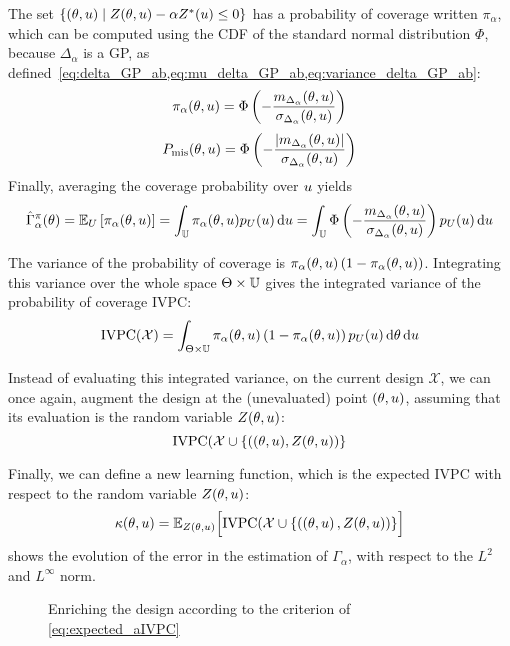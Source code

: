 \documentclass[../../Main_ManuscritThese.tex]{subfiles}
\newcommand\imgpath{/home/victor/acadwriting/Manuscrit/Text/Chapter4/img/}
\begin{document}
  
The set $\{(\theta, u) \mid Z(\theta, u) - \alpha Z^*(u)\leq 0\}$ has a probability of coverage written $\pi_{\alpha}$, which can be computed using the CDF of the standard normal distribution $\Phi$, because $\Delta_{\alpha}$ is a GP, as defined~\cref{eq:delta_GP_ab,eq:mu_delta_GP_ab,eq:variance_delta_GP_ab}:
\begin{equation}
  \label{eq:def_pialphaku}
  \pi_{\alpha}(\theta,u) = \Phi\left(-\frac{m_{\Delta_\alpha}(\theta,u)}{\sigma_{\Delta_\alpha}(\theta,u)}\right)
\end{equation}
\begin{equation}
  P_\mathrm{mis}(\theta, u) = \Phi\left(-\frac{\lvert m_{\Delta_\alpha}(\theta,u)\rvert}{\sigma_{\Delta_\alpha}(\theta,u)}\right)
\end{equation}
Finally, averaging the coverage probability over $u$ yields
\begin{equation}
  \hat{\Gamma}_{\alpha}^{\pi}(\theta) = \mathbb{E}_U\left[\pi_{\alpha}(\theta,u)\right]=\int_{\mathbb{U}}\pi_{\alpha}(\theta,u)p_{U}(u) \,\mathrm{d}u = \int_{\mathbb{U}}\Phi\left(-\frac{m_{\Delta_\alpha}(\theta,u)}{\sigma_{\Delta_\alpha}(\theta,u)}\right)p_{U}(u) \,\mathrm{d}u
\end{equation}

The variance of the probability of coverage is $\pi_\alpha(\theta, u) \left(1 - \pi_{\alpha}(\theta,u)\right)$.
Integrating this variance over the whole space $\Theta \times \mathbb{U}$ gives the integrated variance of the probability of coverage $\mathrm{IVPC}$:
\cite{bect_sequential_2012}
\begin{equation}
  \label{eq:IVPC_def}
\mathrm{IVPC}(\mathcal{X}) =  \int_{\Theta \times \mathbb{U}} \pi_{\alpha}(\theta, u) \left(1 - \pi_{\alpha}(\theta, u)\right)p_{U}(u)\,\mathrm{d}\theta \,\mathrm{d}u
\end{equation}

Instead of evaluating this integrated variance, on the current design $\mathcal{X}$, we can once again, augment the design at the (unevaluated) point $(\theta, u)$, assuming that its evaluation is the random variable $Z(\theta, u)$:
\begin{equation}
  \mathrm{IVPC}(\mathcal{X} \cup \{((\theta, u), Z(\theta, u))\}
\end{equation}

Finally, we can define a new learning function, which is the expected $\mathrm{IVPC}$ with respect to the random variable $Z(\theta, u)$:
\begin{equation}
  \label{eq:expected_aIVPC}
  \kappa(\theta, u) = \mathbb{E}_{Z(\theta, u)}\Big[\mathrm{IVPC}(\mathcal{X} \cup \{   \left(\left(\theta, u \right), Z(\theta, u) \right)  \}     \Big]
\end{equation}
 shows the evolution of the error in the estimation of $\Gamma_{\alpha}$, with respect to the $L^2$ and $L^{\infty}$ norm.
\begin{figure}[ht]
  \centering
  
  \caption{\label{fig:IVPC_enrichment} Enriching the design according to the criterion of \cref{eq:expected_aIVPC}}
\end{figure}
\end{document}

